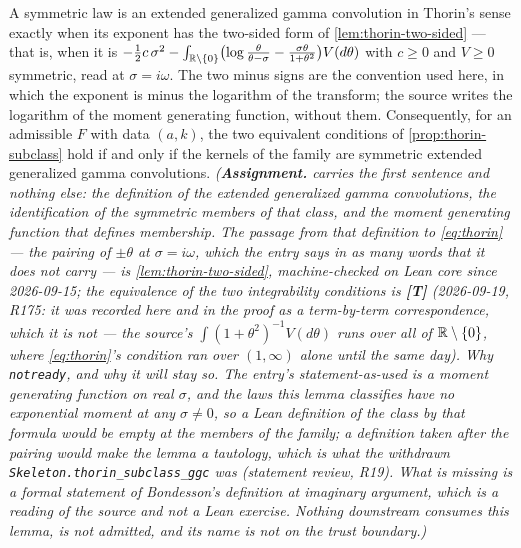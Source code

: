 \begin{lemma}
\label{lem:thorin-ggc}
\notready
{}
A symmetric law is an extended generalized gamma convolution in Thorin's sense exactly when its
exponent has the two-sided form of \ref{lem:thorin-two-sided} --- that is, when it is
$-\tfrac12c\,\sigma^2 - \int_{\mathbb{R}\setminus\{0\}}\bigl(\log\tfrac{\theta}{\theta-\sigma}
- \tfrac{\sigma\theta}{1+\theta^2}\bigr)V(d\theta)$ with $c \ge 0$ and $V \ge 0$ symmetric, read
at $\sigma = i\omega$. The two minus signs are the convention used here, in which the exponent is
minus the logarithm of the transform; the source writes the logarithm of the moment generating
function, without them. Consequently, for an admissible $F$ with data $(a,k)$, the two equivalent
conditions of \ref{prop:thorin-subclass} hold if and only if the kernels of the family are
symmetric extended generalized gamma convolutions.
\statusA\quad{}\quad\emph{(\textbf{Assignment.}  carries the first
sentence and nothing else: the definition of the extended generalized gamma convolutions, the
identification of the symmetric members of that class, and the moment generating function that
defines membership. The passage from that definition to \ref{eq:thorin} --- the pairing of
$\pm\theta$ at $\sigma = i\omega$, which the entry says in as many words that it does not carry
--- is \ref{lem:thorin-two-sided}, machine-checked on Lean core since 2026-09-15; the
equivalence of the two integrability conditions is \textbf{[T]} (2026-09-19, R175: it was recorded
here and in the proof as a term-by-term correspondence, which it is not --- the source's
$\int(1+\theta^2)^{-1}V(d\theta)$ runs over all of $\mathbb{R}\setminus\{0\}$, where \ref{eq:thorin}'s
condition ran over $(1,\infty)$ alone until the same day).
\emph{Why \texttt{notready}, and why it will stay so.} The entry's statement-as-used is a
\emph{moment generating} function on real $\sigma$, and the laws this lemma classifies have no
exponential moment at any $\sigma \ne 0$, so a Lean definition of the class by that formula would
be empty at the members of the family; a definition taken after the pairing would make the lemma
a tautology, which is what the withdrawn \texttt{Skeleton.thorin\_subclass\_ggc} was (statement
review, R19). What is missing is a formal statement of Bondesson's definition at imaginary
argument, which is a reading of the source and not a Lean exercise. Nothing downstream consumes
this lemma,  is not admitted, and its name is not on the trust boundary.)}
\end{lemma}

